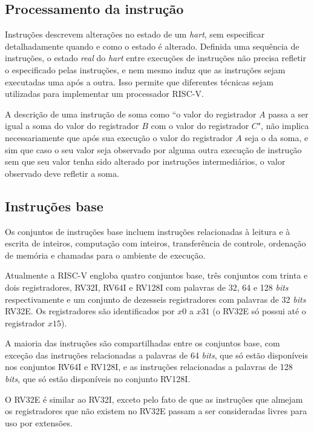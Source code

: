 \subsection{Processamento da instrução}
\label{sec:nstate}

    Instruções descrevem alterações no estado de um \emph{hart}, sem especificar detalhadamente quando 
    e como o estado é alterado. Definida uma sequência de instruções, o estado \emph{real} do \emph{hart} 
    entre execuções de instruções não precisa refletir o especificado pelas instruções, e nem mesmo 
    induz que as instruções sejam executadas uma 
    após a outra. Isso permite que diferentes técnicas sejam utilizadas para implementar um processador RISC-V.

    A descrição de uma instrução de soma como ``o valor do registrador $A$ passa a ser igual a soma do 
    valor do registrador $B$ com o valor do registrador $C$", não implica necessariamente que após sua execução
    o valor do registrador $A$ seja o da soma, e sim que caso o seu valor seja observado por alguma outra execução de
    instrução sem que seu valor tenha sido alterado por instruções intermediários, o valor observado deve refletir a soma.

\subsection{Instruções base}
\label{sec:instBase}

    Os conjuntos de instruções base incluem instruções relacionadas à leitura e à escrita de 
    inteiros, computação com inteiros, transferência de controle, ordenação de memória e 
    chamadas para o ambiente de execução.

    Atualmente a RISC-V engloba quatro conjuntos base, três conjuntos com trinta e dois registradores, RV32I, 
    RV64I e RV128I com palavras de 32, 64 e 128 \emph{bits} respectivamente e um conjunto de 
    dezesseis registradores com palavras de 32 \emph{bits} RV32E. Os registradores são identificados 
    por $x0$ a $x31$ (o RV32E só possui até o registrador $x15$).

    A maioria das instruções são compartilhadas entre os conjuntos base, com exceção das 
    instruções relacionadas a palavras de 64 \emph{bits}, que só estão disponíveis nos 
    conjuntos RV64I e RV128I, e as instruções relacionadas a palavras de 128 \emph{bits}, 
    que só estão disponíveis no conjunto RV128I.

    O RV32E é similar ao RV32I, exceto pelo fato de que as instruções que almejam os
    registradores que não existem no RV32E passam a ser consideradas livres para uso 
    por extensões.

